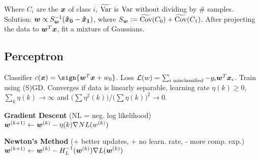 Where $C_i$ are the $\boldsymbol{x}$ of class $i$, $\widetilde{\operatorname{\textrm{Var}}}$ is $\operatorname{\textrm{Var}}$ without dividing by \# samples.
Solution: $\boldsymbol{w} \propto S_{\boldsymbol{w}}^{-1}(\boldsymbol{\hat{x}_0} - \boldsymbol{\hat{x}_1})$,
where $S_{\boldsymbol{w}} \vcentcolon= \widetilde{\operatorname{\textrm{Cov}}}(C_0) + \widetilde{\operatorname{\textrm{Cov}}}(C_1)$.
After projecting the data to $\boldsymbol{w}^T\boldsymbol{x}$, fit a mixture of Gaussians.

\subsection*{Perceptron}

Classifier $c(\b{x}) = \sign{\b{w}^T\b{x} + w_0}$.
Loss $\mathcal{L}(w) = \sum_{i \text{ misclassified}} -y_i \boldsymbol{w}^T\boldsymbol{x}_i$.
Train using (S)GD. Converges if data is linearly separable,
learning rate $\eta(k) \geq 0$, $\sum_k\eta(k)\rightarrow\infty$ and
$\big(\sum \eta^2(k)\big)
/
\big(\sum \eta(k)\big)^2
\rightarrow 0$.

\textbf{Gradient Descent} (NL = neg. log likelihood)\\
$\boldsymbol{w}^{(k+1)} \leftarrow \boldsymbol{w}^{(k)} - \eta(k)\nabla NL(w^{(k)})$

\textbf{Newton's Method} (+ better updates, + no learn. rate, - more comp. exp.)\\
$\boldsymbol{w}^{(k+1)} \leftarrow \boldsymbol{w}^{(k)} - H_{L}^{-1}(\boldsymbol{w}^{(k)}) \nabla L(\boldsymbol{w}^{(k)})$

